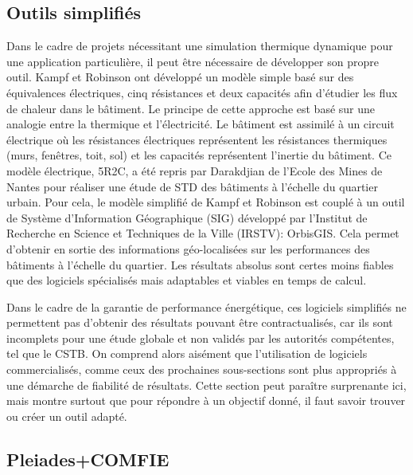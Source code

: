 \subsection*{Outils simplifiés}

Dans le cadre de projets nécessitant une simulation thermique dynamique pour une application particulière, il peut être nécessaire de développer son propre outil. Kampf et Robinson \cite{Kampf-07} ont développé un modèle simple basé sur des équivalences électriques, cinq résistances et deux capacités afin d'étudier les flux de chaleur dans le bâtiment. Le principe de cette approche est basé sur une analogie entre la thermique et l'électricité. Le bâtiment est assimilé à un circuit électrique où les résistances électriques représentent les résistances thermiques (murs, fenêtres, toit, sol) et les capacités représentent l'inertie du bâtiment. Ce modèle électrique, 5R2C, a été repris par Darakdjian \cite{Darakdjian-13} de l'Ecole des Mines de Nantes pour réaliser une étude de STD des bâtiments à l'échelle du quartier urbain. Pour cela, le modèle simplifié de Kampf et Robinson est couplé à un outil de Système d'Information Géographique (SIG) développé par l'Institut de Recherche en Science et Techniques de la Ville (IRSTV): OrbisGIS. Cela permet d'obtenir en sortie des informations géo-localisées sur les performances des bâtiments à l'échelle du quartier. Les résultats absolus sont certes moins fiables que des logiciels spécialisés mais adaptables et viables en temps de calcul.

Dans le cadre de la garantie de performance énergétique, ces logiciels simplifiés ne permettent pas d'obtenir des résultats pouvant être contractualisés, car ils sont incomplets pour une étude globale et non validés par les autorités compétentes, tel que le CSTB. On comprend alors aisément que l'utilisation de logiciels commercialisés, comme ceux des prochaines sous-sections sont plus appropriés à une démarche de fiabilité de résultats. Cette section peut paraître surprenante ici, mais montre surtout que pour répondre à un objectif donné, il faut savoir trouver ou créer un outil adapté.

\subsection*{Pleiades+COMFIE}

